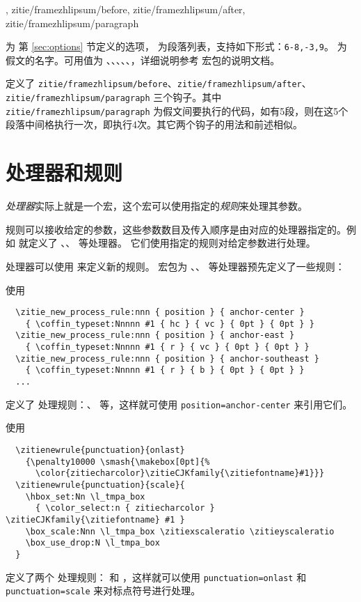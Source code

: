 \documentclass{ctxdoc}
\begin{document}
\begin{function}{
  \framezhlipsum,
  zitie/framezhlipsum/before,
  zitie/framezhlipsum/after,
  zitie/framezhlipsum/paragraph
}
  \begin{syntax}
       
  \end{syntax}
   为  第 \ref{sec:options} 节定义的选项， 为段落列表，支持如下形式：\verb|6-8,-3,9|。 为假文的名字。可用值为 、、、、、，详细说明参考  宏包的说明文档。

  定义了 \verb|zitie/framezhlipsum/before|、\verb|zitie/framezhlipsum/after|、\verb|zitie/framezhlipsum/paragraph| 三个钩子。其中 \verb|zitie/framezhlipsum/paragraph| 为假文间要执行的代码，如有5段，则在这5个段落中间格执行一次，即执行4次。其它两个钩子的用法和前述相似。
\end{function}


\section{处理器和规则}\label{sec:processors}

\emph{处理器}实际上就是一个宏，这个宏可以使用指定的\emph{规则}来处理其参数。

规则可以接收给定的参数，这些参数数目及传入顺序是由对应的处理器指定的。例如  就定义了 、、 等处理器。
它们使用指定的规则对给定参数进行处理。

处理器可以使用  来定义新的规则。 宏包为 、、 等处理器预先定义了一些规则：

使用
\begin{verbatim}
  \zitie_new_process_rule:nnn { position } { anchor-center }
    { \coffin_typeset:Nnnnn #1 { hc } { vc } { 0pt } { 0pt } }
  \zitie_new_process_rule:nnn { position } { anchor-east }
    { \coffin_typeset:Nnnnn #1 { r } { vc } { 0pt } { 0pt } }
  \zitie_new_process_rule:nnn { position } { anchor-southeast }
    { \coffin_typeset:Nnnnn #1 { r } { b } { 0pt } { 0pt } }
  ...
\end{verbatim}
定义了  处理规则：、 等，这样就可使用 \verb|position=anchor-center| 来引用它们。

使用
\begin{verbatim}
  \zitienewrule{punctuation}{onlast}
    {\penalty10000 \smash{\makebox[0pt]{%
      \color{zitiecharcolor}\zitieCJKfamily{\zitiefontname}#1}}}
  \zitienewrule{punctuation}{scale}{
    \hbox_set:Nn \l_tmpa_box 
      { \color_select:n { zitiecharcolor } \zitieCJKfamily{\zitiefontname} #1 }
    \box_scale:Nnn \l_tmpa_box \zitiexscaleratio \zitieyscaleratio 
    \box_use_drop:N \l_tmpa_box 
  }
\end{verbatim}
定义了两个  处理规则： 和 ，这样就可以使用 \verb|punctuation=onlast| 和 \verb|punctuation=scale| 来对标点符号进行处理。
\end{document}
